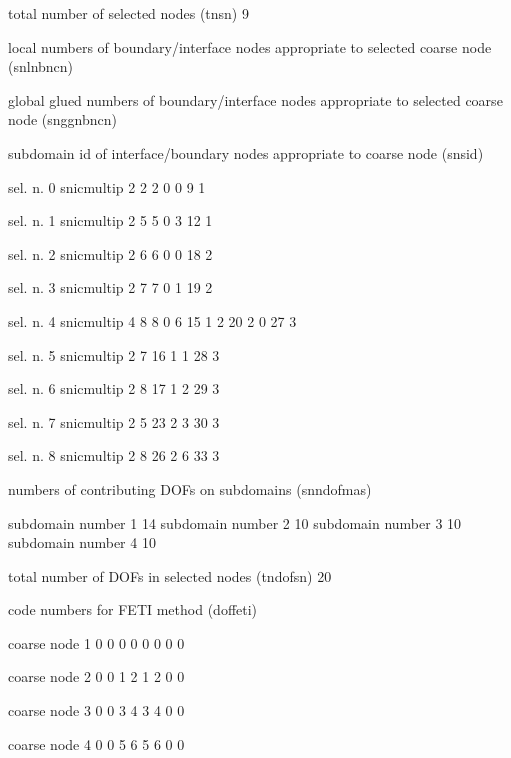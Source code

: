  total number of selected nodes (tnsn)  9


 local numbers of boundary/interface nodes appropriate to selected coarse node (snlnbncn)

 global glued numbers of boundary/interface nodes appropriate to selected coarse node (snggnbncn)

 subdomain id of interface/boundary nodes appropriate to coarse node (snsid)

 sel. n.      0   snicmultip       2
         2       2       0
         0       9       1

 sel. n.      1   snicmultip       2
         5       5       0
         3      12       1

 sel. n.      2   snicmultip       2
         6       6       0
         0      18       2

 sel. n.      3   snicmultip       2
         7       7       0
         1      19       2

 sel. n.      4   snicmultip       4
         8       8       0
         6      15       1
         2      20       2
         0      27       3

 sel. n.      5   snicmultip       2
         7      16       1
         1      28       3

 sel. n.      6   snicmultip       2
         8      17       1
         2      29       3

 sel. n.      7   snicmultip       2
         5      23       2
         3      30       3

 sel. n.      8   snicmultip       2
         8      26       2
         6      33       3


 numbers of contributing DOFs on subdomains (snndofmas)

 subdomain number      1   14
 subdomain number      2   10
 subdomain number      3   10
 subdomain number      4   10

 total number of DOFs in selected nodes (tndofsn)  20

 code numbers for FETI method (doffeti)


 coarse node      1
         0     0        0     0
         0     0        0     0

 coarse node      2
         0     0        1     2
         1     2        0     0

 coarse node      3
         0     0        3     4
         3     4        0     0

 coarse node      4
         0     0        5     6
         5     6        0     0

